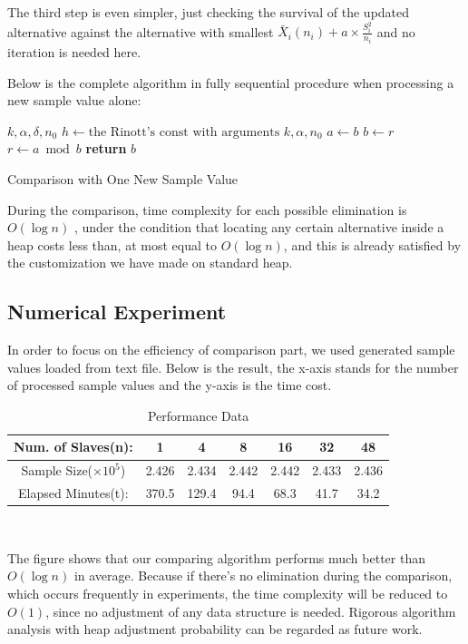 The third step is even simpler, just checking the survival of the updated alternative against the alternative with smallest $\bar{X}_i(n_i) + a \times \frac{S_i^2}{n_i}$ and no iteration is needed here.

Below is the complete algorithm in fully sequential procedure when processing a new sample value alone:

\begin{algorithm}
 \begin{algorithmic}[1]
 \Require $k, \alpha, \delta, n_0$
 \State $h \gets \text{the Rinott's const with arguments } k, \alpha, n_0$
 \State 
 \State $a\gets b$
 \State $b\gets r$
 \State $r\gets a\bmod b$
 \EndWhile
 \State \textbf{return} $b$ 
 \end{algorithmic}
 \caption{Comparison with One New Sample Value}
 \label{comparsion_one}
\end{algorithm}

During the comparison, time complexity for each possible elimination is $O(\log n)$ , under the condition that locating any certain alternative inside a heap costs less than, at most equal to $O(\log n)$, and this is already satisfied by the customization we have made on standard heap.

\subsection{Numerical Experiment}

In order to focus on the efficiency of comparison part, we used generated sample values loaded from text file. Below is the result, the x-axis stands for the number of processed sample values and the y-axis is the time cost.

\begin{table}[ht]
\begin{center}
\begin{tabular}{|c|c|c|c|c|c|c|}
\hline
Num. of Slaves(n): & 1 & 4 & 8 & 16 & 32 & 48 \\
\hline
Sample Size($\times 10^5$) & 2.426 & 2.434 & 2.442 & 2.442 & 2.433 & 2.436\\
\hline
Elapsed Minutes(t): & 370.5 & 129.4 & 94.4 & 68.3 & 41.7 & 34.2 \\
\hline
\end{tabular} \\
\caption{Performance Data}
\end{center}
\end{table}

The figure shows that our comparing algorithm performs much better than $O(\log n)$ in average. Because if there's no elimination during the comparison, which occurs frequently in experiments, the time complexity will be reduced to $O(1)$, since no adjustment of any data structure is needed. Rigorous algorithm analysis with heap adjustment probability can be regarded as future work.